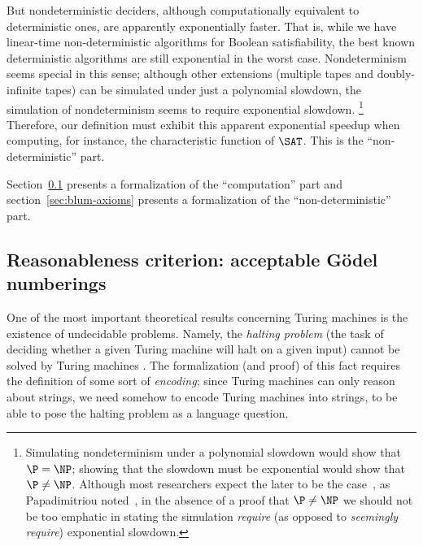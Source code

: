 \documentclass[12pt]{article}
\theoremstyle{definition}
\begin{document}
But nondeterministic deciders,
although computationally equivalent to deterministic ones,
are apparently exponentially faster.
That is, while we have linear-time non-deterministic algorithms for Boolean satisfiability,
the best known deterministic algorithms are still exponential in the worst case.
Nondeterminism seems special in this sense;
although other extensions (multiple tapes and doubly-infinite tapes)
can be simulated under just a polynomial slowdown,
the simulation of nondeterminism seems to require exponential slowdown.%
\footnote{
    Simulating nondeterminism under a polynomial slowdown would show that $\P = \NP$;
    showing that the slowdown must be exponential would show that $\P \neq \NP$.
    Although most researchers expect the later to be the case~\cite[p.~54]{Gasarch2012},
    as Papadimitriou noted~\cite[p.~412]{Papadimitriou1994},
    in the absence of a proof that $\P \neq \NP$
    we should not be too emphatic in stating the simulation \emph{require}
    (as opposed to \emph{seemingly require}) exponential slowdown.
}
Therefore,
our definition must exhibit this apparent exponential speedup
when computing, for instance, the characteristic function\footnotemark{} of $\SAT$.
This is the ``non-deterministic'' part.

Section~\ref{sec:godel-numberings}
presents a formalization of the ``computation'' part
and section~\ref{sec:blum-axioms}
presents a formalization of the ``non-deterministic'' part.

\subsection{Reasonableness criterion: acceptable Gödel numberings}
\label{sec:godel-numberings}

One of the most important theoretical results concerning Turing machines
is the existence of undecidable problems.
Namely, the \emph{halting problem}
(the task of deciding whether a given Turing machine will halt on a given input)
cannot be solved by Turing machines \cite[p.~23]{AroraBarak2009}.
The formalization (and proof) of this fact
requires the definition of some sort of \emph{encoding};
since Turing machines can only reason about strings,
we need somehow to encode Turing machines into strings,
to be able to pose the halting problem as a language question.
\end{document}
